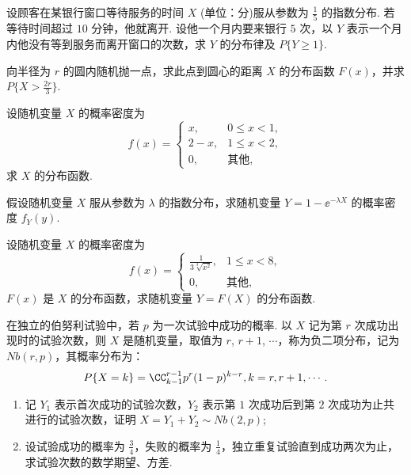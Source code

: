 	\begin{titwo}
		设顾客在某银行窗口等待服务的时间 $X$ (单位：分)服从参数为 $\frac{1}{5}$ 的指数分布. 若等待时间超过 $10$ 分钟，他就离开. 设他一个月内要来银行 $5$ 次，以 $Y$ 表示一个月内他没有等到服务而离开窗口的次数，求 $Y$ 的分布律及 $P\{ Y \geq 1 \}$.
	\end{titwo}

	\begin{titwo}
		向半径为 $r$ 的圆内随机抛一点，求此点到圆心的距离 $X$ 的分布函数 $F(x)$，并求 $P \bigl\{ X > \frac{2r}{3} \bigr\}$.
	\end{titwo}

	\begin{titwo}
		设随机变量 $X$ 的概率密度为
		\[
			f(x) = \begin{cases}
				x, & 0 \leq x < 1, \\
				2 - x, & 1 \leq x < 2, \\
				0, & \text{其他},
			\end{cases}
		\]
		求 $X$ 的分布函数.
	\end{titwo}

	\begin{titwo}
		假设随机变量 $X$ 服从参数为 $\lambda$ 的指数分布，求随机变量 $Y = 1 - \ee^{-\lambda X}$ 的概率密度 $f_{Y}(y)$.
	\end{titwo}

	\begin{titwo}
		设随机变量 $X$ 的概率密度为
		\[
		f(x) = \begin{cases}
			\frac{1}{3 \sqrt[3]{x^{2}}}, & 1 \leq x < 8, \\
			0, & \text{其他},
		\end{cases}
		\]
		$F(x)$ 是 $X$ 的分布函数，求随机变量 $Y = F(X)$ 的分布函数.
	\end{titwo}

	\begin{titwo}
		在独立的伯努利试验中，若 $p$ 为一次试验中成功的概率. 以 $X$ 记为第 $r$ 次成功出现时的试验次数，则 $X$ 是随机变量，取值为 $r$, $r+1$, $\cdots$，称为负二项分布，记为 $Nb(r,p)$，其概率分布为：
		\[
			P\{X = k\} = \CC_{k-1}^{r-1} p^{r} (1 - p)^{k-r}, k = r,r+1,\cdots.
		\]
		\begin{enumerate}
			\item 记 $Y_{1}$ 表示首次成功的试验次数，$Y_{2}$ 表示第 $1$ 次成功后到第 $2$ 次成功为止共进行的试验次数，证明 $X = Y_{1} + Y_{2} \sim Nb(2,p)$;
			\item 设试验成功的概率为 $\frac{3}{4}$，失败的概率为 $\frac{1}{4}$，独立重复试验直到成功两次为止，求试验次数的数学期望、方差.
		\end{enumerate}
	\end{titwo}
